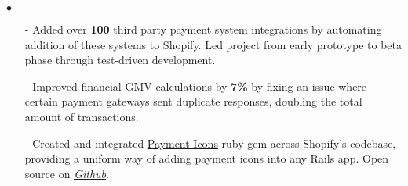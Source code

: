 \documentclass[11pt]{article}
\newenvironment{achievements}{\begin{list}{$\bullet$}{\topsep 0pt \itemsep -1.5pt \leftmargin 5pt}}{\vspace*{4pt}\end{list}}
\begin{document}
\begin{achievements}

\begin{itemize}
\item[-]Added over \textbf{100} third party payment system integrations by automating addition of these systems to Shopify. Led project from early prototype to beta phase through test-driven development.
\vspace{2pt}
\item[-]Improved financial GMV calculations by \textbf{7\%} by fixing an issue where certain payment gateways sent duplicate responses, doubling the total amount of transactions.
\vspace{2pt}
\item[-]Created and integrated \href{https://github.com/activemerchant/payment_icons}{Payment Icons} ruby gem across Shopify's codebase, providing a uniform way of adding payment icons into any Rails app. Open source on \href{https://github.com/activemerchant/payment_icons}{\textit{Github}}.
\end{itemize}
\end{achievements}

\vspace{5pt}
\end{document}
